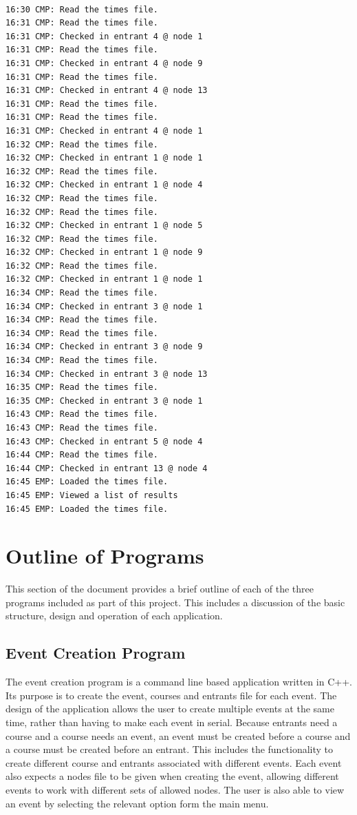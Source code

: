 \documentclass{article}
\begin{document}
\begin{center}
	\begin{lstlisting}[showstringspaces=false, caption={Output from the log file generated when creating the results shown in the listing \ref{lst:results-output}}]
	
16:30 CMP: Read the times file.
16:31 CMP: Read the times file.
16:31 CMP: Checked in entrant 4 @ node 1
16:31 CMP: Read the times file.
16:31 CMP: Checked in entrant 4 @ node 9
16:31 CMP: Read the times file.
16:31 CMP: Checked in entrant 4 @ node 13
16:31 CMP: Read the times file.
16:31 CMP: Read the times file.
16:31 CMP: Checked in entrant 4 @ node 1
16:32 CMP: Read the times file.
16:32 CMP: Checked in entrant 1 @ node 1
16:32 CMP: Read the times file.
16:32 CMP: Checked in entrant 1 @ node 4
16:32 CMP: Read the times file.
16:32 CMP: Read the times file.
16:32 CMP: Checked in entrant 1 @ node 5
16:32 CMP: Read the times file.
16:32 CMP: Checked in entrant 1 @ node 9
16:32 CMP: Read the times file.
16:32 CMP: Checked in entrant 1 @ node 1
16:34 CMP: Read the times file.
16:34 CMP: Checked in entrant 3 @ node 1
16:34 CMP: Read the times file.
16:34 CMP: Read the times file.
16:34 CMP: Checked in entrant 3 @ node 9
16:34 CMP: Read the times file.
16:34 CMP: Checked in entrant 3 @ node 13
16:35 CMP: Read the times file.
16:35 CMP: Checked in entrant 3 @ node 1
16:43 CMP: Read the times file.
16:43 CMP: Read the times file.
16:43 CMP: Checked in entrant 5 @ node 4
16:44 CMP: Read the times file.
16:44 CMP: Checked in entrant 13 @ node 4
16:45 EMP: Loaded the times file.
16:45 EMP: Viewed a list of results
16:45 EMP: Loaded the times file.

	\end{lstlisting}
\end{center}

\section{Outline of Programs}
This section of the document provides a brief outline of each of the three programs included as part of this project. This includes a discussion of the basic structure, design and operation of each application.

\subsection{Event Creation Program}
The event creation program is a command line based application written in C++. Its purpose is to create the event, courses and entrants file for each event. The design of the application allows the user to create multiple events at the same time, rather than having to make each event in serial. Because entrants need a course and a course needs an event, an event must be created before a course and a course must be created before an entrant. This includes the functionality to create different course and entrants associated with different events. Each event also expects a nodes file to be given when creating the event, allowing different events to work with different sets of allowed nodes. The user is also able to view an event by selecting the relevant option form the main menu.
\end{document}
